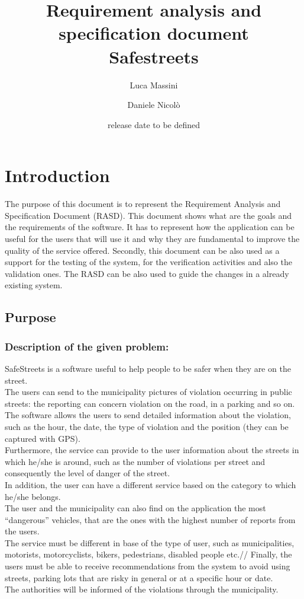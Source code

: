 \documentclass[titlepage]{article}
\author{Luca Massini \and Daniele Nicolò}
\title{Requirement analysis and specification document
\\ Safestreets}
\date{release date to be defined}
\begin{document}
\maketitle
\newpage 
\tableofcontents
\newpage

\section{Introduction}
The purpose of this document is to represent the Requirement Analysis and Specification Document (RASD).
This document shows what are the goals and the requirements of the software.
It has to represent how the application can be useful for the users that will use it and why they are fundamental to improve the quality of the service offered. Secondly, this document can be also used as a support for the testing of the system, for the verification activities and also the validation ones. The RASD can be also used to guide the changes in a already existing system.
\subsection{Purpose}

\subsubsection{Description of the given problem:}
SafeStreets is a software useful to help people to be safer when they are on the street.\\
The users can send to the municipality pictures of violation occurring in public streets: the reporting can concern violation on the road, in a parking and so on.\\
The software allows the users to send detailed information about the violation, such as the hour, the date, the type of violation and the position (they can be captured with GPS).\\
Furthermore, the service can provide to the user information about the streets in which he/she is around,
such as the number of violations per street and consequently the level of danger of the street.\\
In addition, the user can have a different service based on the category to which he/she belongs.\\
The user and the municipality can also find on the application the most “dangerous” vehicles, that are the ones with the highest number of reports from the users.\\
The service must be different in base of the type of user, such as municipalities, motorists, motorcyclists, bikers, pedestrians, disabled people etc.//
Finally, the users must be able to receive recommendations from the system to avoid using streets, parking lots that are risky in general or at a specific hour or date.\\
The authorities will be informed of the violations through the municipality.
\end{document}
